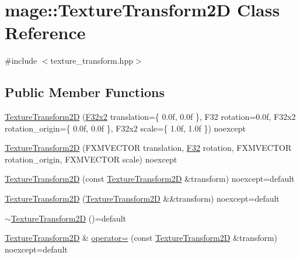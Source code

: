 \hypertarget{classmage_1_1_texture_transform2_d}{}\section{mage\+:\+:Texture\+Transform2D Class Reference}
\label{classmage_1_1_texture_transform2_d}


{\ttfamily \#include $<$texture\+\_\+transform.\+hpp$>$}

\subsection*{Public Member Functions}
\begin{DoxyCompactItemize}
\item 
\mbox{\hyperlink{classmage_1_1_texture_transform2_d_a9833dce43985ee12c80aea2c1f14650e}{Texture\+Transform2D}} (\mbox{\hyperlink{namespacemage_aee4759dedc8def6c6dec26b5c7eddf29}{F32x2}} translation=\{ 0.\+0f, 0.\+0f \}, F32 rotation=0.\+0f, F32x2 rotation\+\_\+origin=\{ 0.\+0f, 0.\+0f \}, F32x2 scale=\{ 1.\+0f, 1.\+0f \}) noexcept
\item 
\mbox{\hyperlink{classmage_1_1_texture_transform2_d_a2f3c6e0be64ad4b1bfcf0b7a53a1aaf2}{Texture\+Transform2D}} (F\+X\+M\+V\+E\+C\+T\+OR translation, \mbox{\hyperlink{namespacemage_aa97e833b45f06d60a0a9c4fc22ae02c0}{F32}} rotation, F\+X\+M\+V\+E\+C\+T\+OR rotation\+\_\+origin, F\+X\+M\+V\+E\+C\+T\+OR scale) noexcept
\item 
\mbox{\hyperlink{classmage_1_1_texture_transform2_d_a1a1fb4386170fad9eb6ca2d5ce213192}{Texture\+Transform2D}} (const \mbox{\hyperlink{classmage_1_1_texture_transform2_d}{Texture\+Transform2D}} \&transform) noexcept=default
\item 
\mbox{\hyperlink{classmage_1_1_texture_transform2_d_adf3d2c8e2966508c933c2bb323880ba7}{Texture\+Transform2D}} (\mbox{\hyperlink{classmage_1_1_texture_transform2_d}{Texture\+Transform2D}} \&\&transform) noexcept=default
\item 
\mbox{\hyperlink{classmage_1_1_texture_transform2_d_a4df184f3e160d08d0f5a7dd4c58f2bec}{$\sim$\+Texture\+Transform2D}} ()=default
\item 
\mbox{\hyperlink{classmage_1_1_texture_transform2_d}{Texture\+Transform2D}} \& \mbox{\hyperlink{classmage_1_1_texture_transform2_d_ac99bc6d9f6d4995072d63b569bf8a2df}{operator=}} (const \mbox{\hyperlink{classmage_1_1_texture_transform2_d}{Texture\+Transform2D}} \&transform) noexcept=default
\item 

\end{DoxyCompactItemize}
